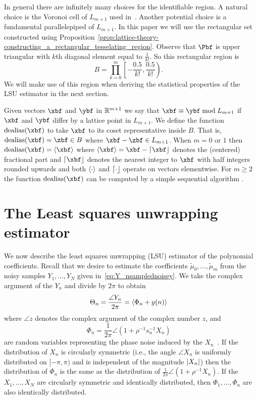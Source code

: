 \documentclass[journal]{IEEEtran}
\begin{document}
In general there are infinitely many choices for the identifiable region. A natural choice is the Voronoi cell of $L_{m+1}$ used in~\cite{McKilliam2009IndentifiabliltyAliasingPolyphase}. Another potential choice is a fundamental parallelepiped of $L_{m+1}$. In this paper we will use the rectangular set constructed using Proposition~\ref{prop:lattice-theory-constructing_a_rectangular_tesselating_region}. Observe that $\Pbf$ is upper triangular with $k$th diagonal element equal to $\tfrac{1}{k!}$.  So this rectangular region is
\begin{equation}\label{eq:rectangular_identifiable_region}
B = \prod_{k=0}^{m}\left[ -\frac{0.5}{k!}, \frac{0.5}{k!}  \right).
\end{equation}
We will make use of this region when deriving the statistical properties of the LSU estimator in the next section. 

Given vectors $\xbf$ and $\ybf$ in ${\mathbb R}^{m+1}$ we say that $\xbf \equiv \ybf \bmod L_{m+1}$ if $\xbf$ and $\ybf$ differ by a lattice point in $L_{m+1}$.  We define the function $\dealias(\xbf)$ to take $\xbf$ to its coset representative inside $B$. That is, $\dealias(\xbf) = \zbf \in B$ where $\xbf - \zbf \in L_{m+1}$.  %
When $m = 0$ or $1$ then $\dealias(\xbf) = \fracpart{\xbf}$ where $\fracpart{\xbf} = \xbf - \round{\xbf}$ denotes the (centered) fractional part and $\round{\xbf}$ denotes the nearest integer to $\xbf$ with half integers rounded upwards and both $\left\langle \cdot \right\rangle$ and ${\left\lceil \cdot \right\rfloor}$ operate on vectors elementwise.  For $m \geq 2$ the function $\dealias(\xbf)$ can be computed by a simple sequential algorithm \cite[Sec. 7.2.1]{McKilliam2010thesis}.

\section{The Least squares unwrapping estimator}\label{sec:least-squar-unwr}

We now describe the least squares unwrapping (LSU) estimator of the polynomial coefficients. Recall that we desire to estimate the coefficients $\tilde{\mu}_0, \dots, \tilde{\mu}_m$ from the noisy samples $Y_1, \dots, Y_N$ given in~\eqref{eq:Y_nsamplednoisey}.  We take the complex argument of the $Y_n$ and divide by $2\pi$ to obtain
\begin{equation}\label{eq:noise_circ_poly}
\Theta_n = \frac{\angle{Y_n}}{2\pi} = \left\langle  \Phi_n + y(n)  \right\rangle
\end{equation}
where $\angle{z}$ denotes the complex argument of the complex number $z$, and 
\[
\Phi_n = \frac{1}{2\pi}\angle(1 + \rho^{-1}s_n^{-1}X_n)
\] 
are random variables representing the phase noise induced by the $X_n$~\cite{Tretter1985,Quinn2009_dasp_phase_only_information_loss}.  If the distribution of $X_n$ is circularly symmetric (i.e., the angle $\angle X_n$ is uniformly distributed on $[-\pi, \pi)$ and is independent of the magnitude $\left\vert X_n \right\vert$) then the distribution of $\Phi_n$ is the same as the distribution of $\tfrac{1}{2\pi}\angle(1 + \rho^{-1}X_n)$.  If the $X_1, \dots, X_N$ are circularly symmetric and identically distributed, then $\Phi_1, \dots, \Phi_n$ are also identically distributed.
\end{document}
